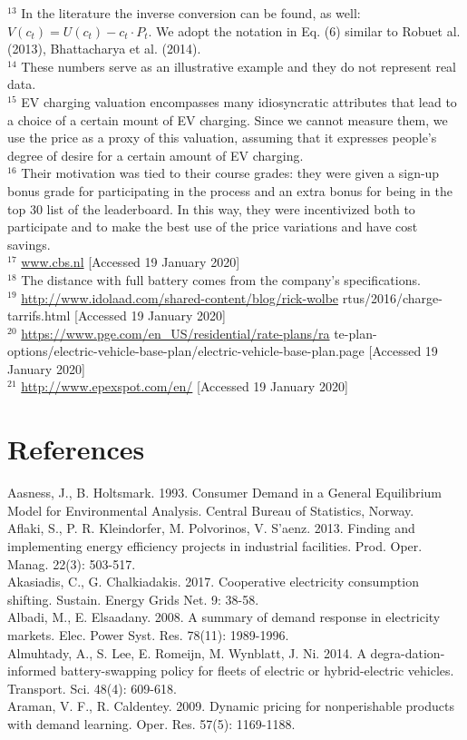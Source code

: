 \documentclass[10pt]{article}
\begin{document}
${ }^{13}$ In the literature the inverse conversion can be found, as well: $V\left(c_{t}\right)=U\left(c_{t}\right)-c_{t} \cdot P_{t}$. We adopt the notation in Eq. (6) similar to Robuet al. (2013), Bhattacharya et al. (2014).\\
${ }^{14}$ These numbers serve as an illustrative example and they do not represent real data.\\
${ }^{15}$ EV charging valuation encompasses many idiosyncratic attributes that lead to a choice of a certain mount of EV charging. Since we cannot measure them, we use the price as a proxy of this valuation, assuming that it expresses people's degree of desire for a certain amount of EV charging.\\
${ }^{16}$ Their motivation was tied to their course grades: they were given a sign-up bonus grade for participating in the process and an extra bonus for being in the top 30 list of the leaderboard. In this way, they were incentivized both to participate and to make the best use of the price variations and have cost savings.\\
${ }^{17}$ \href{http://www.cbs.nl}{www.cbs.nl} [Accessed 19 January 2020]\\
${ }^{18}$ The distance with full battery comes from the company's specifications.\\
${ }^{19}$ \href{http://www.idolaad.com/shared-content/blog/rick-wolbe}{http://www.idolaad.com/shared-content/blog/rick-wolbe} rtus/2016/charge-tarrifs.html [Accessed 19 January 2020]\\
${ }^{20}$ \href{https://www.pge.com/en_US/residential/rate-plans/ra}{https://www.pge.com/en\_US/residential/rate-plans/ra} te-plan-options/electric-vehicle-base-plan/electric-vehicle-base-plan.page [Accessed 19 January 2020]\\
${ }^{21}$ \href{http://www.epexspot.com/en/}{http://www.epexspot.com/en/} [Accessed 19 January 2020]

\section*{References}
Aasness, J., B. Holtsmark. 1993. Consumer Demand in a General Equilibrium Model for Environmental Analysis. Central Bureau of Statistics, Norway.\\
Aflaki, S., P. R. Kleindorfer, M. Polvorinos, V. S'aenz. 2013. Finding and implementing energy efficiency projects in industrial facilities. Prod. Oper. Manag. 22(3): 503-517.\\
Akasiadis, C., G. Chalkiadakis. 2017. Cooperative electricity consumption shifting. Sustain. Energy Grids Net. 9: 38-58.\\
Albadi, M., E. Elsaadany. 2008. A summary of demand response in electricity markets. Elec. Power Syst. Res. 78(11): 1989-1996.\\
Almuhtady, A., S. Lee, E. Romeijn, M. Wynblatt, J. Ni. 2014. A degra-dation-informed battery-swapping policy for fleets of electric or hybrid-electric vehicles. Transport. Sci. 48(4): 609-618.\\
Araman, V. F., R. Caldentey. 2009. Dynamic pricing for nonperishable products with demand learning. Oper. Res. 57(5): 1169-1188.
\end{document}
